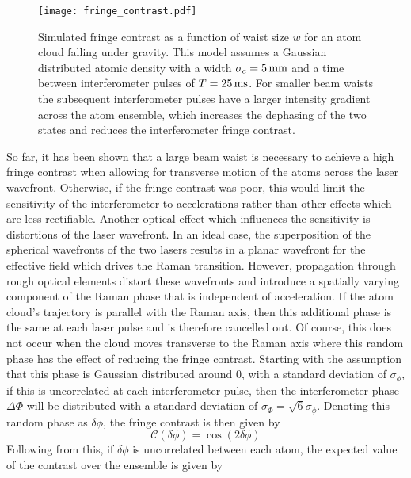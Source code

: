 \begin{figure}[!ht]
    \centering
    \texttt{[image: fringe\_contrast.pdf]}
    \caption[Simulated fringe contrast vs beam waist size]{Simulated fringe contrast as a function of waist size \(w\) for an atom cloud falling under gravity. This model assumes a Gaussian distributed atomic density with a width \(\sigma_c = \sivalue{5}{\milli\metre}\) and a time between interferometer pulses of \(T = \sivalue{25}{\milli\second}\). For smaller beam waists the subsequent interferometer pulses have a larger intensity gradient across the atom ensemble, which increases the dephasing of the two states and reduces the interferometer fringe contrast.}
    \label{fig:raman_fringecontrast}
\end{figure}

So far, it has been shown that a large beam waist is necessary to achieve a high fringe contrast when allowing for transverse motion of the atoms across the laser wavefront. Otherwise, if the fringe contrast was poor, this would limit the sensitivity of the interferometer to accelerations rather than other effects which are less rectifiable. Another optical effect which influences the sensitivity is distortions of the laser wavefront. In an ideal case, the superposition of the spherical wavefronts of the two lasers results in a planar wavefront for the effective field which drives the Raman transition. However, propagation through rough optical elements distort these wavefronts and introduce a spatially varying component of the Raman phase that is independent of acceleration. If the atom cloud's trajectory is parallel with the Raman axis, then this additional phase is the same at each laser pulse and is therefore cancelled out. Of course, this does not occur when the cloud moves transverse to the Raman axis where this random phase has the effect of reducing the fringe contrast. Starting with the assumption that this phase is Gaussian distributed around 0, with a standard deviation of \(\sigma_\phi\), if this is uncorrelated at each interferometer pulse, then the interferometer phase \(\Delta \Phi\) will be distributed with a standard deviation of \(\sigma_\Phi = \sqrt{6} \sigma_\phi\). Denoting this random phase as \(\delta\phi\), the fringe contrast is then given by
\begin{equation}
    \mathcal{C}(\delta \phi) = \cos\left(2 \delta\phi\right)
\end{equation}
Following from this, if \( \delta \phi\) is uncorrelated between each atom, the expected value of the contrast over the ensemble is given by 
